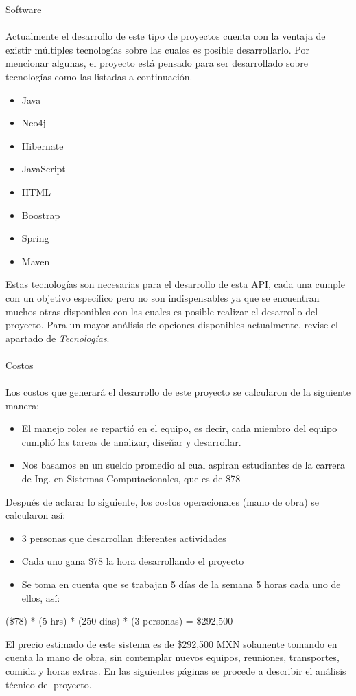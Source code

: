 \newpage
Software  
\\\\
Actualmente el desarrollo de este tipo de proyectos cuenta con la ventaja de existir múltiples tecnologías sobre las cuales es posible desarrollarlo. Por mencionar algunas, el proyecto está pensado para ser desarrollado sobre tecnologías como las listadas a continuación.
\begin{itemize}
\item Java
\item Neo4j
\item Hibernate
\item JavaScript
\item HTML
\item Boostrap
\item Spring
\item Maven
\end{itemize}
Estas tecnologías son necesarias para el desarrollo de esta API, cada una cumple con un objetivo específico pero no son indispensables ya que se encuentran muchos otras disponibles con las cuales es posible realizar el desarrollo del proyecto. Para un mayor análisis de opciones disponibles actualmente, revise el apartado de \emph{Tecnologías}.
\\\\
Costos 
\\\\
Los costos que generará el desarrollo de este proyecto se calcularon de la siguiente manera: 
\begin{itemize}
\item El manejo roles se repartió en el equipo, es decir, cada miembro del equipo cumplió las tareas de analizar, diseñar y desarrollar.  
\item Nos basamos en un sueldo promedio al cual aspiran estudiantes de la carrera de 
Ing. en Sistemas Computacionales, que es de \$78
\end{itemize}
Después de aclarar lo siguiente, los costos operacionales (mano de obra) se calcularon así:
\begin{itemize}
\item 3 personas que desarrollan diferentes actividades 
\item Cada uno gana \$78 la hora desarrollando el proyecto
\item Se toma en cuenta que se trabajan 5 días de la semana 5 horas cada uno de ellos, así: 
\end{itemize}
(\$78) * (5 hrs) * (250 dias) * (3 personas) = \$292,500
 
El precio estimado de este sistema es de \$292,500 MXN solamente tomando en cuenta la mano de obra, sin contemplar nuevos equipos, reuniones, transportes, comida y horas extras. En las siguientes páginas se procede a describir el análisis técnico del proyecto.
\newpage
